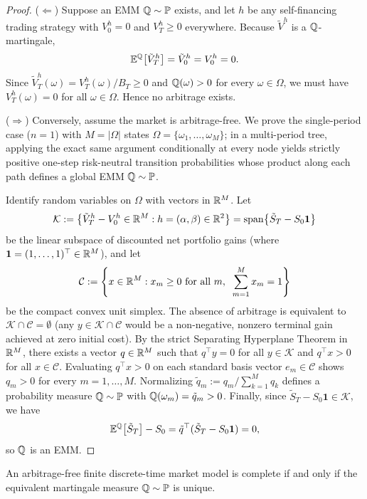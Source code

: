 \begin{proof}
($\Leftarrow$) Suppose an EMM $\mathbb{Q} \sim \mathbb{P}$ exists, and let $h$ be any self-financing trading strategy with $V_0^h = 0$ and $V_T^h \ge 0$ everywhere. Because $\tilde{V}^h$ is a $\mathbb{Q}$-martingale,
\[
    \mathbb{E}^{\mathbb{Q}}\bigl[\tilde{V}_T^h\bigr] = \tilde{V}_0^h = V_0^h = 0.
\]
Since $\tilde{V}_T^h(\omega) = V_T^h(\omega) / B_T \ge 0$ and $\mathbb{Q}(\omega) > 0$ for every $\omega \in \Omega$, we must have $V_T^h(\omega) = 0$ for all $\omega \in \Omega$. Hence no arbitrage exists.

($\Rightarrow$) Conversely, assume the market is arbitrage-free. We prove the single-period case ($n = 1$) with $M = |\Omega|$ states $\Omega = \{\omega_1, \dots, \omega_M\}$; in a multi-period tree, applying the exact same argument conditionally at every node yields strictly positive one-step risk-neutral transition probabilities whose product along each path defines a global EMM $\mathbb{Q} \sim \mathbb{P}$.

Identify random variables on $\Omega$ with vectors in $\mathbb{R}^M$. Let
\[
    \mathcal{K} := \bigl\{ \tilde{V}_T^h - V_0^h \in \mathbb{R}^M : h = (\alpha, \beta) \in \mathbb{R}^2 \bigr\} = \operatorname{span}\bigl\{\tilde{S}_T - S_0 \mathbf{1}\bigr\}
\]
be the linear subspace of discounted net portfolio gains (where $\mathbf{1} = (1, \dots, 1)^\top \in \mathbb{R}^M$), and let
\[
    \mathcal{C} := \left\{ x \in \mathbb{R}^M : x_m \ge 0 \text{ for all } m,\;\; \sum_{m=1}^{M} x_m = 1 \right\}
\]
be the compact convex unit simplex. The absence of arbitrage is equivalent to $\mathcal{K} \cap \mathcal{C} = \emptyset$ (any $y \in \mathcal{K} \cap \mathcal{C}$ would be a non-negative, nonzero terminal gain achieved at zero initial cost). By the strict Separating Hyperplane Theorem in $\mathbb{R}^M$, there exists a vector $q \in \mathbb{R}^M$ such that $q^\top y = 0$ for all $y \in \mathcal{K}$ and $q^\top x > 0$ for all $x \in \mathcal{C}$. Evaluating $q^\top x > 0$ on each standard basis vector $e_m \in \mathcal{C}$ shows $q_m > 0$ for every $m = 1, \dots, M$. Normalizing $\tilde{q}_m := q_m / \sum_{k=1}^{M} q_k$ defines a probability measure $\mathbb{Q} \sim \mathbb{P}$ with $\mathbb{Q}(\omega_m) = \tilde{q}_m > 0$. Finally, since $\tilde{S}_T - S_0 \mathbf{1} \in \mathcal{K}$, we have
\[
    \mathbb{E}^{\mathbb{Q}}\bigl[\tilde{S}_T\bigr] - S_0 = \tilde{q}^\top (\tilde{S}_T - S_0 \mathbf{1}) = 0,
\]
so $\mathbb{Q}$ is an EMM.
\end{proof}

\begin{theorem}
\label{thm:ftap2_discrete}
An arbitrage-free finite discrete-time market model is complete if and only if the equivalent martingale measure $\mathbb{Q} \sim \mathbb{P}$ is unique.
\end{theorem}

